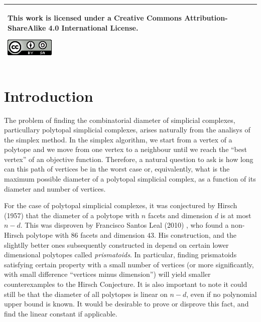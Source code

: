 \documentclass[12pt,a4paper]{article}
\theoremstyle{plain}
\theoremstyle{definition}
\begin{document}
~\\
\vfill
\begin{tabular}{|p{}|}
\hline
\vspace{0.08cm}
This work is licensed under a Creative Commons Attribution-ShareAlike 4.0 International License.
\begin{center}
\includegraphics[scale=1]{img/ccbysa.png}
\end{center}\\
\hline
\end{tabular}

\newpage

\tableofcontents
\clearpage
\vspace*{\fill}
\clearpage
\setcounter{page}{1}

\section{Introduction}
The problem of finding the combinatorial diameter of simplicial complexes, particullary polytopal simplicial complexes, arises naturally from the analisys of the simplex method. In the simplex algorithm, we start from a vertex of a polytope and we move from one vertex to a neighbour until we reach the ``best vertex'' of an objective function. Therefore, a natural question to ask is how long can this path of vertices be in the worst case or, equivalently, what is the maximum possible diameter of a polytopal simplicial complex, as a function of its diameter and number of vertices.

For the case of polytopal simplicial complexes, it was conjectured by Hirsch (1957) that the diameter of a polytope with $n$ facets and dimension $d$ is at most $n-d$. This was disproven by Francisco Santos Leal (2010) \cite{counterexample}, who found a non-Hirsch polytope with $86$ facets and dimension $43$. His construction, and the slightlly better ones subsequently constructed in \cite{improvement} depend on certain lower dimensional polytopes called \emph{prismatoids}. In particular, finding prismatoids satisfying certain property with a small number of vertices (or more significantly, with small difference ``vertices minus dimension'') will yield smaller counterexamples to the Hirsch Conjecture. It is also important to note it could still be that the diameter of all polytopes is linear on $n-d$, even if no polynomial upper bound is known\cite{Kalai:polymath3}. It would be desirable to prove or disprove this fact, and find the linear constant if applicable. 
\end{document}
